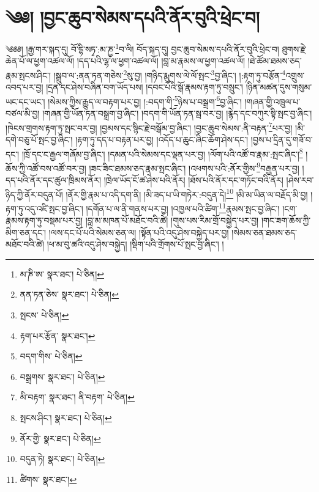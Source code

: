 \setcounter{footnote}{0} 
\chapter{༄༅། །བྱང་ཆུབ་སེམས་དཔའི་ནོར་བུའི་ཕྲེང་བ།}༄༅༅། །རྒྱ་གར་སྐད་དུ། བོ་དྷི་སཏྭ་:མ་ཎྱ་\footnote{མ་ཎི་ཨ་  སྣར་ཐང་།  པེ་ཅིན། }བ་ལི། བོད་སྐད་དུ། བྱང་ཆུབ་སེམས་དཔའི་ནོར་བུའི་ཕྲེང་བ། ཐུགས་རྗེ་ཆེན་པོ་ལ་ཕྱག་འཚལ་ལོ། །དད་པའི་ལྷ་ལ་ཕྱག་འཚལ་ལོ། །བླ་མ་རྣམས་ལ་ཕྱག་འཚལ་ལོ། །ཐེ་ཚོམ་ཐམས་ཅད་རྣམ་སྤངས་ཤིང་། །སྒྲུབ་ལ་:ནན་ཏན་གཅེས་\footnote{ནན་ཏན་ཅེས་  སྣར་ཐང་།  པེ་ཅིན། }སུ་བྱ། །གཉིད་རྨུགས་ལེ་ལོ་སྤང་\footnote{སྤངས་  པེ་ཅིན། }བྱ་ཞིང་། །:རྟག་ཏུ་བརྩོན་\footnote{རྟག་པར་རྩོན་  སྣར་ཐང་། }འགྲུས་འབད་པར་བྱ། །དྲན་དང་ཤེས་བཞིན་བག་ཡོད་པས། །དབང་པོའི་སྒོ་རྣམས་རྟག་ཏུ་བསྲུང་། །ཉིན་མཚན་དུས་གསུམ་ཡང་དང་ཡང་། །སེམས་ཀྱིས་རྒྱུད་ལ་བརྟག་པར་བྱ། །:བདག་གི་\footnote{བདག་གིས་  པེ་ཅིན། }ཉེས་པ་བསྒྲག་\footnote{བསྒྲགས་  སྣར་ཐང་།  པེ་ཅིན། }བྱ་ཞིང་། །གཞན་གྱི་འཁྲུལ་པ་བཙལ་མི་བྱ། །གཞན་གྱི་ཡོན་ཏན་བསྒྲག་བྱ་ཞིང་། །བདག་གི་ཡོན་ཏན་སྦ་བར་བྱ། །རྙེད་དང་བཀུར་སྟི་སྤང་བྱ་ཞིང་། །ཁེངས་གྲགས་རྟག་ཏུ་སྤང་བར་བྱ། །བྱམས་དང་སྙིང་རྗེ་བསྒོམ་བྱ་ཞིང་། །བྱང་ཆུབ་སེམས་:ནི་བརྟན་\footnote{མི་བརྟག་  སྣར་ཐང་། ནི་བརྟག་  པེ་ཅིན། }པར་བྱ། །མི་དགེ་བཅུ་པོ་སྤང་བྱ་ཞིང་། །རྟག་ཏུ་དད་པ་བརྟན་པར་བྱ། །འདོད་པ་ཆུང་ཞིང་ཆོག་ཤེས་དང་། །བྱས་པ་དྲིན་དུ་གཟོ་བ་དང་། །ཁྲོ་དང་ང་རྒྱལ་གཞོམ་བྱ་ཞིང་། །དམན་པའི་སེམས་དང་ལྡན་པར་བྱ། །ལོག་པའི་འཚོ་བ་རྣམ་:སྤང་ཞིང་།\footnote{སྤངས་ཤིང་།  སྣར་ཐང་།  པེ་ཅིན། } །ཆོས་ཀྱི་འཚོ་བས་འཚོ་བར་བྱ། །ཟང་ཟིང་ཐམས་ཅད་རྣམ་སྤང་ཞིང་། །འཕགས་པའི་:ནོར་གྱིས་\footnote{ནོར་གྱི་  སྣར་ཐང་།  པེ་ཅིན། }བརྒྱན་པར་བྱ། །དད་པའི་ནོར་དང་ཚུལ་ཁྲིམས་ནོར། །ཁྲེལ་ཡོད་ངོ་ཚ་ཤེས་པའི་ནོར། །ཐོས་པའི་ནོར་དང་གཏོང་བའི་ནོར། །ཤེས་རབ་ཉིད་ཀྱི་ནོར་བདུན་པོ། །ནོར་གྱི་རྣམ་པ་འདི་དག་ནི། །མི་ཟད་པ་ཡི་གཏེར་:བདུན་དེ།\footnote{བདུན་ཏེ།  སྣར་ཐང་།  པེ་ཅིན། } །མི་མ་ཡིན་ལ་བརྗོད་མི་བྱ། །རྟག་ཏུ་འདུ་འཛི་སྤང་བྱ་ཞིང་། །དགོན་པ་ལ་ནི་གནས་པར་བྱ། །འཁྱལ་པའི་ཚིག་\footnote{ཚིགས་  སྣར་ཐང་། }རྣམས་སྤང་བྱ་ཞིང་། །ངག་རྣམས་རྟག་ཏུ་བསྡམ་པར་བྱ། །བླ་མ་མཁན་པོ་མཐོང་བའི་ཚེ། །གུས་པས་རིམ་གྲོ་བསྐྱེད་པར་བྱ། །གང་ཟག་ཆོས་ཀྱི་མིག་ཅན་དང་། །ལས་དང་པོ་པའི་སེམས་ཅན་ལ། །སྟོན་པའི་འདུ་ཤེས་བསྐྱེད་པར་བྱ། །སེམས་ཅན་ཐམས་ཅད་མཐོང་བའི་ཚེ། །ཕ་མ་བུ་ཚའི་འདུ་ཤེས་བསྐྱེད། །སྡིག་པའི་གྲོགས་པོ་སྤང་བྱ་ཞིང་། །
